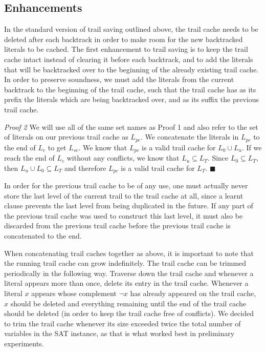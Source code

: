 \documentclass[runningheads]{llncs}
\begin{document}
\subsection{Enhancements}

In the standard version of trail saving outlined above, the trail
cache needs to be deleted after each backtrack in order to make room
for the new backtracked literals to be cached. The first enhancement
to trail saving is to keep the trail cache intact instead of clearing
it before each backtrack, and to add the literals that will be
backtracked over to the beginning of the already existing trail
cache. In order to preserve soundness, we must add the literals from
the current backtrack to the beginning of the trail cache, such that
the trail cache has as its prefix the literals which are being
backtracked over, and as its suffix the previous trail cache. \newline

\textit{Proof 2} We will use all of the same set names as Proof 1 and
also refer to the set of literals on our previous trail cache as
$L_{pc}$. We concatenate the literals in $L_{pc}$ to the end of $L_c$
to get $L_{sc}$. We know that $L_{pc}$ is a valid trail cache for
$L_0 \cup L_u$. If we reach the end of $L_c$ without any conflicts, we
know that $L_u \subseteq L_T$. Since $L_0 \subseteq L_T$, then
$L_u \cup L_0 \subseteq L_T$ and therefore $L_{pc}$ is a valid trail
cache for $L_T$. $\blacksquare$\newline

In order for the previous trail cache to be of any use, one must
actually never store the last level of the current trail to the trail
cache at all, since a learnt clause prevents the last level from being
duplicated in the future. If any part of the previous trail cache was
used to construct this last level, it must also be discarded from the
previous trail cache before the previous trail cache is concatenated
to the end.

When concatenating trail caches together as above, it is important to
note that the running trail cache can grow indefinitely. The trail
cache can be trimmed periodically in the following way. Traverse down
the trail cache and whenever a literal appears more than once, delete
its entry in the trail cache. Whenever a literal $x$ appears whose
complement $\lnot x$ has already appeared on the trail cache, $x$
should be deleted and everything remaining until the end of the trail
cache should be deleted (in order to keep the trail cache free of
conflicts).  We decided to trim the trail cache whenever its size
exceeded twice the total number of variables in the SAT instance, as
that is what worked best in preliminary experiments.\newline
\end{document}
